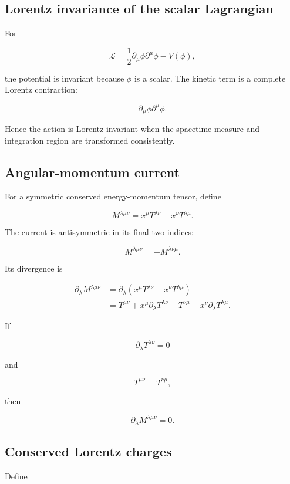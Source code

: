 \subsection{Lorentz invariance of the scalar Lagrangian}

For

\[
\mathcal{L}
=
\frac{1}{2}
\partial_{\mu}\phi
\partial^{\mu}\phi
-
V(\phi),
\]

the potential is invariant because \(\phi\) is a scalar. The kinetic term is a complete Lorentz contraction:

\[
\partial_{\mu}\phi
\partial^{\mu}\phi.
\]

Hence the action is Lorentz invariant when the spacetime measure and integration region are transformed consistently.

\subsection{Angular-momentum current}

For a symmetric conserved energy-momentum tensor, define

\[
\boxed{
M^{\lambda\mu\nu}
=
x^{\mu}T^{\lambda\nu}
-
x^{\nu}T^{\lambda\mu}
}.
\]

The current is antisymmetric in its final two indices:

\[
M^{\lambda\mu\nu}
=
-
M^{\lambda\nu\mu}.
\]

Its divergence is

\[
\begin{aligned}
\partial_{\lambda}M^{\lambda\mu\nu}
&=
\partial_{\lambda}
\left(
x^{\mu}T^{\lambda\nu}
-
x^{\nu}T^{\lambda\mu}
\right)
\\
&=
T^{\mu\nu}
+
x^{\mu}\partial_{\lambda}T^{\lambda\nu}
-
T^{\nu\mu}
-
x^{\nu}\partial_{\lambda}T^{\lambda\mu}.
\end{aligned}
\]

If

\[
\partial_{\lambda}T^{\lambda\nu}=0
\]

and

\[
T^{\mu\nu}=T^{\nu\mu},
\]

then

\[
\boxed{
\partial_{\lambda}M^{\lambda\mu\nu}=0
}.
\]

\subsection{Conserved Lorentz charges}

Define


